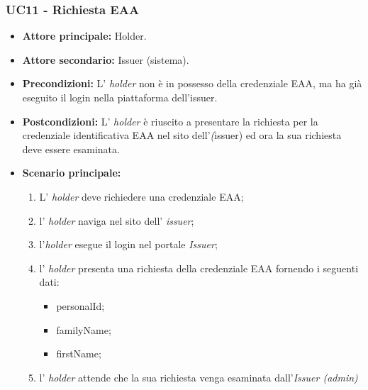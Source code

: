 \subsubsection{UC11 - Richiesta EAA}
\begin{itemize}
\item \textbf{Attore principale:} Holder.
\item \textbf{Attore secondario:} Issuer (sistema).
\item \textbf{Precondizioni:} L’ \textit{holder} non è in possesso della credenziale EAA, ma ha già eseguito il login nella piattaforma dell'issuer.
\item \textbf{Postcondizioni:} L’ \textit{holder} è riuscito a presentare la richiesta per la credenziale identificativa EAA nel sito dell'\textit(issuer) ed ora la sua richiesta deve essere esaminata.
\item \textbf{Scenario principale:} 
    \begin{enumerate}
        \item L' \textit{holder} deve richiedere una credenziale EAA; 
        \item l' \textit{holder} naviga nel sito dell' \textit{issuer};
        \item l'\textit{holder} esegue il login nel portale \textit{Issuer};
        \item l' \textit{holder} presenta una richiesta della credenziale EAA fornendo i seguenti dati:
        \begin{itemize}
            \item personalId;
            \item familyName;
            \item firstName;
        \end{itemize}
        \item l' \textit{holder} attende che la sua richiesta venga esaminata dall'\textit{Issuer (admin)}
    \end{enumerate}
\end{itemize}

